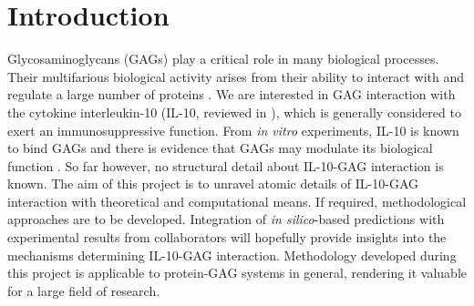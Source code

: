 \chapter{Introduction}

Glycosaminoglycans (GAGs) play a critical role in many biological processes.
Their multifarious biological activity arises from their ability to interact
with and regulate a large number of proteins \cite{handel_2005}. We are
interested in GAG interaction with the cytokine interleukin-10 (IL-10, reviewed
in \cite{moore_2001}), which is generally considered to exert an
immunosuppressive function. From \textit{in vitro} experiments, IL-10 is known
to bind GAGs and there is evidence that GAGs may modulate its biological
function \cite{salek_ardakani_2000}. So far however, no structural detail about
IL-10-GAG interaction is known. The aim of this project is to unravel atomic
details of IL-10-GAG interaction with theoretical and computational means. If
required, methodological approaches are to be developed. Integration of
\textit{in silico}-based predictions with experimental results from
collaborators will hopefully provide insights into the mechanisms determining
IL-10-GAG interaction. Methodology developed during this project is applicable
to protein-GAG systems in general, rendering it valuable for a large field of
research.


\lipsum[1-10]